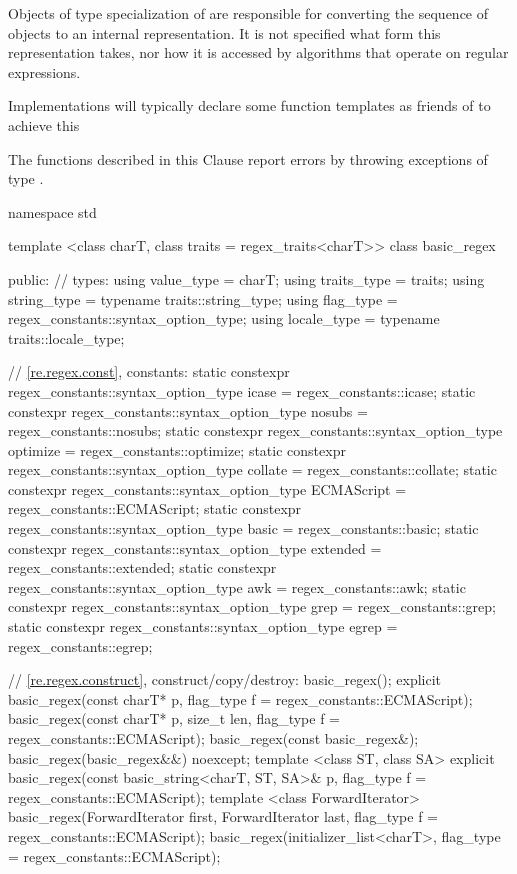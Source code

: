 \pnum
Objects of type specialization of  are responsible for
converting the sequence of  objects to an internal
representation. It is not specified what form this representation
takes, nor how it is accessed by algorithms that operate on regular
expressions. \begin{note} Implementations will typically declare
some function templates as friends of  to achieve
this \end{note}

\pnum
{}%
The functions described in this Clause report errors by throwing
exceptions of type .

%
\begin{codeblock}
namespace std {
  template <class charT,
            class traits = regex_traits<charT>>
  class basic_regex {
  public:
    // types:
    using value_type  =          charT;
    using traits_type =          traits;
    using string_type = typename traits::string_type;
    using flag_type   =          regex_constants::syntax_option_type;
    using locale_type = typename traits::locale_type;

    // \ref{re.regex.const}, constants:
    static constexpr regex_constants::syntax_option_type
      icase = regex_constants::icase;
    static constexpr regex_constants::syntax_option_type
      nosubs = regex_constants::nosubs;
    static constexpr regex_constants::syntax_option_type
      optimize = regex_constants::optimize;
    static constexpr regex_constants::syntax_option_type
      collate = regex_constants::collate;
    static constexpr regex_constants::syntax_option_type
      ECMAScript = regex_constants::ECMAScript;
    static constexpr regex_constants::syntax_option_type
      basic = regex_constants::basic;
    static constexpr regex_constants::syntax_option_type
      extended = regex_constants::extended;
    static constexpr regex_constants::syntax_option_type
      awk = regex_constants::awk;
    static constexpr regex_constants::syntax_option_type
      grep = regex_constants::grep;
    static constexpr regex_constants::syntax_option_type
      egrep = regex_constants::egrep;

    // \ref{re.regex.construct}, construct/copy/destroy:
    basic_regex();
    explicit basic_regex(const charT* p,
      flag_type f = regex_constants::ECMAScript);
    basic_regex(const charT* p, size_t len, flag_type f = regex_constants::ECMAScript);
    basic_regex(const basic_regex&);
    basic_regex(basic_regex&&) noexcept;
    template <class ST, class SA>
      explicit basic_regex(const basic_string<charT, ST, SA>& p, 
                           flag_type f = regex_constants::ECMAScript);
    template <class ForwardIterator>
      basic_regex(ForwardIterator first, ForwardIterator last, 
                  flag_type f = regex_constants::ECMAScript);
    basic_regex(initializer_list<charT>,
      flag_type = regex_constants::ECMAScript);

}}
\end{codeblock}
